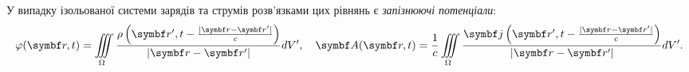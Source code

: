 У випадку ізольованої системи зарядів та струмів розв'язками цих рівнянь є \emph{запізнюючі потенціали}:
\begin{equation}\label{Retarded_potentials}
	\phi(\vect{r} , t) = \iiint\limits_{\Omega}\frac{\rho\left( \vect{r}', t - \frac{|\vect{r} - \vect{r}'|}{c}\right) }{|\vect{r} - \vect{r}'|}dV',
	\quad
	\vect{A}(\vect{r} , t) = \frac1c\iiint\limits_{\Omega}\frac{\vect{j}\left( \vect{r}', t - \frac{|\vect{r} - \vect{r}'|}{c}\right) }{|\vect{r} -
	\vect{r}'|}dV'.
\end{equation}


